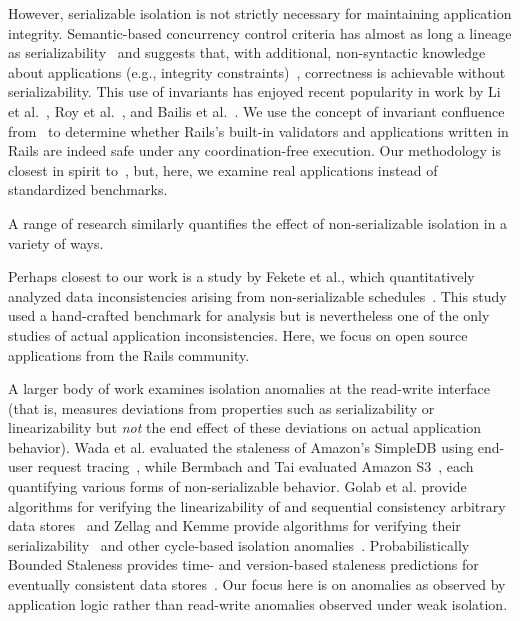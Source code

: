 However, serializable isolation is not strictly necessary for
maintaining application integrity. Semantic-based concurrency
control criteria has almost as long a lineage as
serializability~\cite{eswaran-consistency,ic-survey-two} and suggests
that, with additional, non-syntactic knowledge about applications
(e.g., integrity constraints)~\cite{kung1979optimality}, correctness
is achievable without serializability. This use of invariants has
enjoyed recent popularity in work by Li et al.~\cite{redblue-new}, Roy
et al.~\cite{writes-forest}, and Bailis et al.~\cite{coord-avoid}. We
use the concept of invariant confluence from~\cite{coord-avoid} to
determine whether Rails's built-in validators and applications written
in Rails are indeed safe under any coordination-free execution. Our
methodology is closest in spirit to~\cite{coord-avoid}, but, here, we
examine real applications instead of standardized benchmarks.

 A range of research similarly
quantifies the effect of non-serializable isolation in a variety of
ways.

Perhaps closest to our work is a study by Fekete et al., which
quantitatively analyzed data inconsistencies arising from
non-serializable schedules~\cite{fekete-quantifying}. This study used
a hand-crafted benchmark for analysis but is nevertheless one of the only
studies of actual application inconsistencies. Here, we focus on open
source applications from the Rails community.

A larger body of work examines isolation anomalies at the read-write
interface (that is, measures deviations from properties such as
serializability or linearizability but \textit{not} the end effect of
these deviations on actual application behavior). Wada et
al. evaluated the staleness of Amazon's SimpleDB using end-user
request tracing~\cite{wada-data}, while Bermbach and Tai evaluated
Amazon S3~\cite{bermbach-eventual}, each quantifying various forms of
non-serializable behavior. Golab et al. provide algorithms for
verifying the linearizability of and sequential consistency arbitrary
data stores~\cite{golab-analyzing} and Zellag and Kemme provide
algorithms for verifying their
serializability~\cite{zellag-consistent} and other cycle-based
isolation anomalies~\cite{zellag-real}. Probabilistically Bounded
Staleness provides time- and version-based staleness predictions for
eventually consistent data stores~\cite{pbs}. Our focus here is on
anomalies as observed by application logic rather than read-write
anomalies observed under weak isolation.


